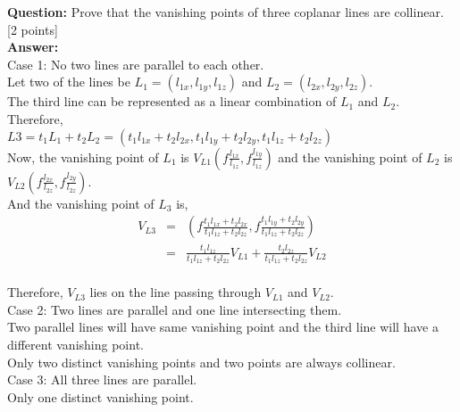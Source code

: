 \documentclass[11pt]{article}
\begin{document}
\setlength\parindent{0pt}

\maketitle

\textbf{Question:} Prove that the vanishing points of three coplanar lines are collinear. \textsf{[2 points]} \\

\textbf{Answer:} \\

Case 1: No two lines are parallel to each other.\\

Let two of the lines be $L_1 = (l_{1x}, l_{1y}, l_{1z})$ and $L_2 = (l_{2x}, l_{2y}, l_{2z})$.\\
The third line can be represented as a linear combination of $L_1$ and $L_2$.\\
Therefore,\\
$L3 = t_1L_1 + t_2L_2 = (t_1l_{1x}+t_2l_{2x}, t_1l_{1y}+t_2l_{2y}, t_1l_{1z}+t_2l_{2z})$\\

Now, the vanishing point of $L_1$ is $V_{L1}(f\frac{l_{1x}}{l_{1z}}, f\frac{l_{1y}}{l_{1z}})$ and the vanishing point of $L_2$ is $V_{L2}(f\frac{l_{2x}}{l_{2z}}, f\frac{l_{2y}}{l_{2z}})$. \\
And the vanishing point of $L_3$ is, \\
\begin{eqnarray*}
V_{L3} &=& (f\frac{t_1l_{1x}+t_2l_{2x}}{t_1l_{1z}+t_2l_{2z}}, f\frac{t_1l_{1y}+t_2l_{2y}}{t_1l_{1z}+t_2l_{2z}})\\
 &=& \frac{t_1l_{1z}}{t_1l_{1z}+t_2l_{2z}}V_{L1} + \frac{t_2l_{2z}}{t_1l_{1z}+t_2l_{2z}}V_{L2} \\
\end{eqnarray*}

Therefore, $V_{L3}$ lies on the line passing through $V_{L1}$ and $V_{L2}$.\\

Case 2: Two lines are parallel and one line intersecting them.\\

Two parallel lines will have same vanishing point and the third line will have a different vanishing point. \\
Only two distinct vanishing points and two points are always collinear. \\

Case 3: All three lines are parallel.\\

Only one distinct vanishing point.\\
\end{document}
